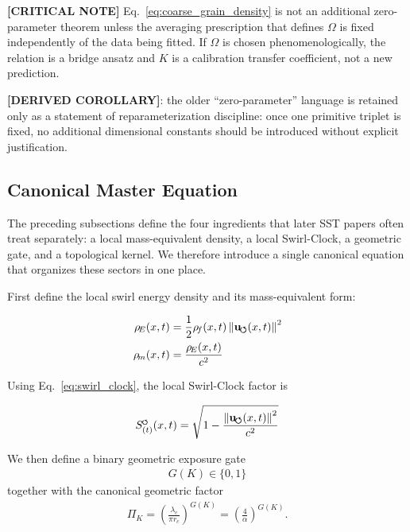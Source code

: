 \documentclass[11pt]{article}
\theoremstyle{definition}
\theoremstyle{plain}
\theoremstyle{remark}
\newcommand{\swirlarrow}{\mathchoice{\mkern-2mu\scriptstyle\boldsymbol{\circlearrowleft}}{\mkern-2mu\scriptstyle\boldsymbol{\circlearrowleft}}{\mkern-2mu\scriptscriptstyle\boldsymbol{\circlearrowleft}}{\mkern-2mu\scriptscriptstyle\boldsymbol{\circlearrowleft}}}
\newcommand{\rhoF}{{\rho_{\!f}}}
\newcommand{\rhoE}{\rho_{\!E}}
\newcommand{\rhoM}{\rho_{\!m}}
\newcommand{\SwirlClock}{{S_{(t)}^{\swirlarrow}}}
\newcommand{\rc}{{r_c}}
\newcommand{\uswirl}{\mathbf{u}_{\!\boldsymbol{\circlearrowleft}}}
\begin{document}
        \textbf{[CRITICAL NOTE]} Eq.~\eqref{eq:coarse_grain_density} is not an additional zero-parameter theorem unless the averaging prescription that defines $\Omega$ is fixed independently of the data being fitted. If $\Omega$ is chosen phenomenologically, the relation is a bridge ansatz and $K$ is a calibration transfer coefficient, not a new prediction.

        \textbf{[DERIVED COROLLARY]}: the older ``zero-parameter'' language is retained only as a statement of reparameterization discipline: once one primitive triplet is fixed, no additional dimensional constants should be introduced without explicit justification.

    \subsection{Canonical Master Equation}
    \label{sec:master-equation}

        The preceding subsections define the four ingredients that later SST papers often treat separately:
        a local mass-equivalent density, a local Swirl-Clock, a geometric gate, and a topological kernel.
        We therefore introduce a single canonical equation that organizes these sectors in one place.

        First define the local swirl energy density and its mass-equivalent form:

        \begin{align}
            \rhoE(x,t) &= \frac{1}{2}\rhoF(x,t)\,\norm{\uswirl(x,t)}^2 \\
            \rhoM(x,t) &= \frac{\rhoE(x,t)}{c^2}
        \end{align}

        Using Eq.~\ref{eq:swirl_clock}, the local Swirl-Clock factor is

        \begin{align}
            \SwirlClock(x,t) = \sqrt{1 - \frac{\norm{\uswirl(x,t)}^2}{c^2}}
        \end{align}

        We then define a binary geometric exposure gate
        \begin{align}
            G(K) \in \{0,1\}
        \end{align}
        together with the canonical geometric factor
        \begin{align}
            \Pi_K = \left( \frac{\lambda_c}{\pi \rc} \right)^{G(K)} = \left( \frac{4}{\alpha} \right)^{G(K)} .
        \end{align}
\end{document}
